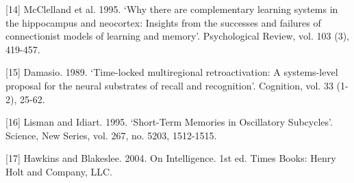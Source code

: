 [14] McClelland et al. 1995. ‘Why there are complementary learning systems in the hippocampus and neocortex: Insights from the successes and failures of connectionist models of learning and memory’. Psychological Review, vol. 103 (3), 419-457. 

[15] Damasio. 1989. ‘Time-locked multiregional retroactivation: A systems-level proposal for the neural substrates of recall and recognition’. Cognition, vol. 33 (1-2), 25-62. 

[16] Lisman and Idiart. 1995. ‘Short-Term Memories in Oscillatory Subcycles’. Science, New Series, vol. 267, no. 5203, 1512-1515. 

[17] Hawkins and Blakeslee. 2004. On Intelligence. 1st ed. Times Books: Henry Holt and Company, LLC. 